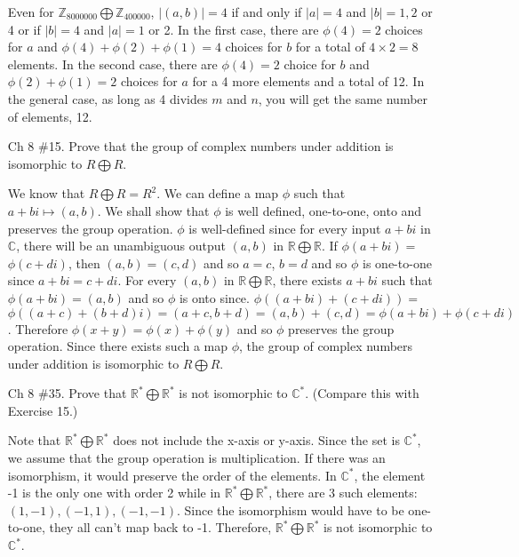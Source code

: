 \documentclass{article}
\newcommand{\Z}{\mathbb Z}
\newcommand{\R}{\mathbb R}
\newcommand{\C}{\mathbb C}
\begin{document}
\begin{enumerate}
\begin{flushleft}
    Even for $\Z_{8000000} \bigoplus \Z_{400000}$, $|(a,b)| = 4$ if and only if $| a | = 4$ and $| b | = 1,2$ or 4 or if $| b | = 4$ and $| a | = 1$ or 2. In the first case, there are $\phi(4) = 2$ choices for $a$ and $\phi(4) + \phi(2) + \phi(1) = 4$ choices for $b$ for a total of $4 \times 2 = 8$ elements. In the second case, there are $\phi(4) = 2$ choice for $b$ and $\phi(2) + \phi(1) = 2$ choices for $a$ for a 4 more elements and a total of 12. In the general case, as long as 4 divides $m$ and $n$, you will get the same number of elements, 12.
    \end{flushleft}

    \item[Ch 8 \#15.]Prove that the group of complex numbers under addition is isomorphic to $R \bigoplus R$.
    
    \begin{flushleft}
    We know that $R \bigoplus R = R^2$. We can define a map $\phi$ such that $a + bi \mapsto (a,b)$. We shall show that $\phi$ is well defined, one-to-one, onto and preserves the group operation. $\phi$ is well-defined since for every input $a + bi$ in $\C$, there will be an unambiguous output $(a,b)$ in $\R \bigoplus \R$. If $\phi(a + bi) =$ $\phi(c + di)$, then $(a,b) = (c,d)$ and so $a=c$, $b=d$ and so $\phi$ is one-to-one since $a + bi = c + di$. For every $(a,b)$ in $\R \bigoplus \R$, there exists $a + bi$ such that $\phi(a + bi) = (a,b)$ and so $\phi$ is onto since. $\phi((a + bi)+(c + di)) =$ $\phi((a+c)+(b+d)i) = (a+c, b+d) = (a,b) + (c,d) = \phi(a + bi) + \phi(c + di)$. Therefore $\phi(x + y) = \phi(x) + \phi(y)$ and so $\phi$ preserves the group operation. Since there exists such a map $\phi$, the group of complex numbers under addition is isomorphic to $R \bigoplus R$.
    \end{flushleft}

    \item[Ch 8 \#35.]Prove that $\R^* \bigoplus \R^*$ is not isomorphic to $\C^*$. (Compare this with Exercise 15.)
    
    \begin{flushleft}
    Note that $\R^* \bigoplus \R^*$ does not include the x-axis or y-axis. Since the set is $\C^*$, we assume that the group operation is multiplication. If there was an isomorphism, it would preserve the order of the elements. In $\C^*$, the element -1 is the only one with order 2 while in $\R^* \bigoplus \R^*$, there are 3 such elements: $(1, -1), (-1, 1), (-1, -1)$. Since the isomorphism would have to be one-to-one, they all can't map back to -1. Therefore, $\R^* \bigoplus \R^*$ is not isomorphic to $\C^*$.
    \end{flushleft}


\end{enumerate}
\end{document}
